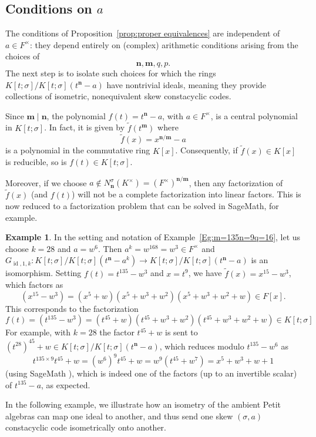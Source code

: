 \documentclass[11pt]{amsart}
\theoremstyle{plain}
\theoremstyle{definition}
\newtheorem{example}[theorem]{Example}
\numberwithin{equation}{section}
\numberwithin{figure}{section}
\newcommand{\Kone}[1]{K[t;\sigma]/K[t;\sigma](t^{\de}-#1)}
\DeclareMathOperator{\id}{id}
\newcommand{\os}{{\mathbf{m}}}  %
\newcommand{\de}{{\mathbf{n}}}  %
\begin{document}
\subsection{Conditions on \texorpdfstring{$a$}{a}}
The conditions of Proposition~\ref{prop:proper equivalences} are independent of $a\in F^\times$: they depend entirely on (complex) arithmetic conditions arising from the choices of
$$
\de, \os, q, p.
$$
The next step is to isolate such choices for which the rings $\Kone{a}$ have nontrivial ideals, meaning they provide collections of isometric, nonequivalent skew constacyclic codes.


Since $\os\mid\de$, the polynomial $f(t)=t^\de-a$, with $a\in F^\times$, is a central polynomial in $K[t;\sigma]$.  In fact,  it is given by $\tilde{f}(t^{\os})$ where
$$
\tilde{f}(x) = x^{\de/\os}-a
$$
is a polynomial in the commutative ring $K[x]$.
Consequently, if $\tilde{f}(x) \in K[x]$ is reducible, so is $f(t)\in K[t;\sigma]$.

Moreover, if we choose $a\notin N_\de^\sigma(K^\times)=(F^\times)^{\de/\os}$, then
any factorization of $\tilde{f}(x)$ (and $f(t)$) will not be a complete factorization into linear factors. This is now reduced to a factorization problem that can be solved in  SageMath, for example.


\begin{example}
In the setting and notation of Example~\ref{Eg:m=135n=9q=16}, let us choose  $k=28$ and $a=w^6$.  Then  $a^k=w^{168}=w^3\in F^\times$ and $G_{\id,1,k}:\Kone{a^k}
    \to \Kone{a}$ is an isomorphism.  Setting $f(t)=t^{135}-w^3$ and $x=t^9$, we have $\tilde{f}(x)=x^{15}-w^3$, which factors as
    $$
    (x^{15}-w^3)=(x^5 + w)  (x^5 + w^3 + w^2)  (x^5 + w^3 + w^2 + w) \in F[x].
    $$
This corresponds to the factorization
$$
f(t) = (t^{135}-w^3)=(t^{45} + w)  (t^{45} + w^3 + w^2)  (t^{45} + w^3 + w^2 + w) \in K[t;\sigma]
$$
For example, with $k=28$ the factor $t^{45}+w$ is sent to $(t^{28})^{45}+w \in \Kone{a}$, which reduces modulo $t^{135}-w^6$ as
$$
t^{135\times 9}t^45+w = (w^6)^9 t^{45}+w = w^9(t^{45}+w^7)=x^5 + w^3 + w + 1
$$
(using SageMath \cite{sagemath}), which is indeed one of the factors (up to an invertible scalar) of $t^{135}-a$, as expected.
\end{example}



In the following example, we illustrate how an isometry of the ambient Petit algebras can map one ideal to another, and thus send one skew $(\sigma,a)$ constacyclic code isometrically onto another.
\end{document}
